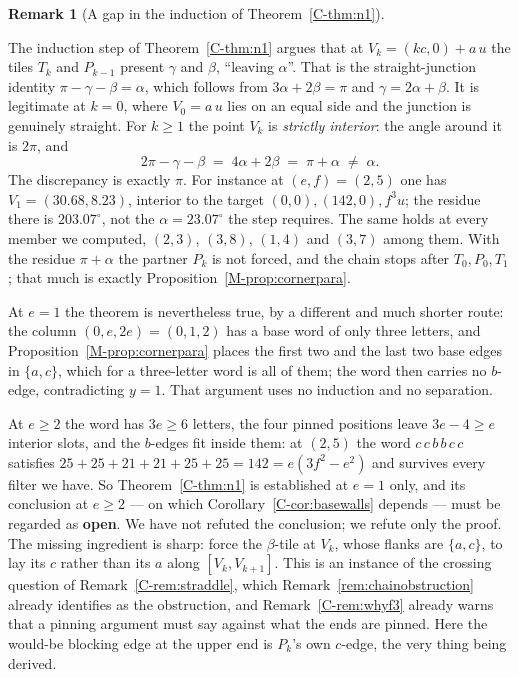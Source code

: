 \documentclass[11pt,reqno]{amsart}
\theoremstyle{plain}
\theoremstyle{definition}
\newtheorem{remark}[theorem]{Remark}
\begin{document}
\begin{remark}[A gap in the induction of Theorem~\ref{C-thm:n1}]\label{O-n1gap}

The induction step of Theorem~\ref{C-thm:n1} argues that at $V_k=(kc,0)+a\,u$ the tiles $T_k$ and
$P_{k-1}$ present $\gamma$ and $\beta$, ``leaving $\alpha$''. That is the straight-junction identity
$\pi-\gamma-\beta=\alpha$, which follows from $3\alpha+2\beta=\pi$ and $\gamma=2\alpha+\beta$. It is
legitimate at $k=0$, where $V_0=a\,u$ lies on an equal side and the junction is genuinely straight.
For $k\ge1$ the point $V_k$ is \emph{strictly interior}: the angle around it is $2\pi$, and
\[
2\pi-\gamma-\beta \;=\; 4\alpha+2\beta \;=\; \pi+\alpha \;\ne\;\alpha .
\]
The discrepancy is exactly $\pi$. For instance at $(e,f)=(2,5)$ one has
$V_1=(30.68,8.23)$, interior to the target $(0,0),(142,0),f^3u$; the residue there is $203.07^\circ$,
not the $\alpha=23.07^\circ$ the step requires. The same holds at every member we computed,
$(2,3)$, $(3,8)$, $(1,4)$ and $(3,7)$ among them. With the residue $\pi+\alpha$ the partner $P_k$ is
not forced, and the chain stops after $T_0,P_0,T_1$; that much is exactly
Proposition~\ref{M-prop:cornerpara}.

At $e=1$ the theorem is nevertheless true, by a different and much shorter route: the column
$(0,e,2e)=(0,1,2)$ has a base word of only three letters, and
Proposition~\ref{M-prop:cornerpara} places the first two and the last two base edges in $\{a,c\}$,
which for a three-letter word is all of them; the word then carries no $b$-edge, contradicting
$y=1$. That argument uses no induction and no separation.

At $e\ge2$ the word has $3e\ge6$ letters, the four pinned positions leave $3e-4\ge e$ interior slots,
and the $b$-edges fit inside them: at $(2,5)$ the word $c\,c\,b\,b\,c\,c$ satisfies
$25+25+21+21+25+25=142=e(3f^2-e^2)$ and survives every filter we have. So Theorem~\ref{C-thm:n1} is
established at $e=1$ only, and its conclusion at $e\ge2$ --- on which
Corollary~\ref{C-cor:basewalls} depends --- must be regarded as \textbf{open}. We have not refuted the
conclusion; we refute only the proof. The missing ingredient is sharp: force the $\beta$-tile at
$V_k$, whose flanks are $\{a,c\}$, to lay its $c$ rather than its $a$ along $[V_k,V_{k+1}]$. This is
an instance of the crossing question of Remark~\ref{C-rem:straddle}, which
Remark~\ref{rem:chainobstruction} already identifies as the obstruction, and
Remark~\ref{C-rem:whyf3} already warns that a pinning argument must say against what the ends are
pinned. Here the would-be blocking edge at the upper end is $P_k$'s own $c$-edge, the very thing
being derived.
\end{remark}
\end{document}
